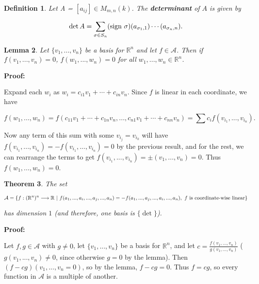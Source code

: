 \documentclass{article}
\theoremstyle{colontheorem}
\newtheorem{theorem}{Theorem}[section]
\newtheorem{definition}[theorem]{Definition}
\newtheorem{lemma}[theorem]{Lemma}
\newenvironment{Theorem}
{
	\begin{mdframed}[backgroundcolor=TheoremOrange!10]
	\begin{theorem}
}
{
	\end{theorem}
	\end{mdframed}
	
	\vspace{.15in}
}
\newenvironment{Def}
{
	\begin{mdframed}[backgroundcolor=DefGreen!10]
	\begin{definition}
}
{
	\end{definition}
	\end{mdframed}
	
	\vspace{.15in}
}
\newenvironment{Lemma}
{
	\begin{mdframed}[backgroundcolor=LemmaYellow!10]
	\begin{lemma}
}
{
	\end{lemma}
	\end{mdframed}
	
	\vspace{.15in}
}
\newenvironment{Proof}
{
	\vspace{-.3in}
	
	\begin{mdframed}[backgroundcolor=ProofPurple!10]
	\textbf{Proof:}%
}
{
	\end{mdframed}
	
	\vspace{.15in}
}
\begin{document}
\begin{Def}
	
	Let A = $[a_{ij}] \in M_{m, n}(k)$. The \textbf{determinant} of $A$ is given by
	
	$$
		\det A = \sum\limits_{\sigma \in S_n} (\textnormal{sign } \sigma)(a_{\sigma_1, 1}) \cdots (a_{\sigma_n, n}).
	$$
	
\end{Def}



\begin{Lemma}
	
	Let $\{v_1, ..., v_n\}$ be a basis for $\mathbb{R}^n$ and let $f \in \mathcal{A}$. Then if $f(v_1, ..., v_n) = 0$, $f(w_1, ..., w_n) = 0$ for all $w_1, ..., w_n \in \mathbb{R}^n$.
	
\end{Lemma}



\begin{Proof}
	Expand each $w_i$ as $w_i = c_{i1} v_1 + \cdots + c_{in} v_n$. Since $f$ is linear in each coordinate, we have
	
	$$
		f(w_1, ..., w_n) = f(c_{11} v_1 + \cdots + c_{1n} v_n, ..., c_{n1} v_1 + \cdots + c_{nn} v_n) = \sum c_i f(v_{i_1}, ..., v_{i_n}).
	$$
	
	Now any term of this sum with some $v_{i_j} = v_{i_k}$ will have $f(v_{i_1}, ..., v_{i_n}) = -f(v_{i_1}, ..., v_{i_n}) = 0$ by the previous result, and for the rest, we can rearrange the terms to get $f(v_{i_1}, ..., v_{i_n}) = \pm (v_1, ..., v_n) = 0$. Thus $f(w_1, ..., w_n) = 0$.
	
\end{Proof}



\begin{Theorem}
	
	The set
	
	$$
		\mathcal{A} = \{f : (\mathbb{R}^n)^n \longrightarrow \mathbb{R}\ |\ f(a_1, ..., a_i, ..., a_j, ..., a_n) = -f(a_1, ..., a_j, ..., a_i, ..., a_n), \\ \ f \textnormal{ is coordinate-wise linear} \}
	$$
	
	has dimension $1$ (and therefore, one basis is $\{\det\}$).
	
\end{Theorem}



\begin{Proof}
	Let $f, g \in \mathcal{A}$ with $g \neq 0$, let $\{v_1, ..., v_n\}$ be a basis for $\mathbb{R}^n$, and let $c = \frac{f(v_1, ..., v_n)}{g(v_1, ..., v_n)}$ ($g(v_1, ..., v_n) \neq 0$, since otherwise $g = 0$ by the lemma). Then $(f - cg)(v_1, ..., v_n = 0)$, so by the lemma, $f - cg = 0$. Thus $f = cg$, so every function in $\mathcal{A}$ is a multiple of another.
	
\end{Proof}
\end{document}
